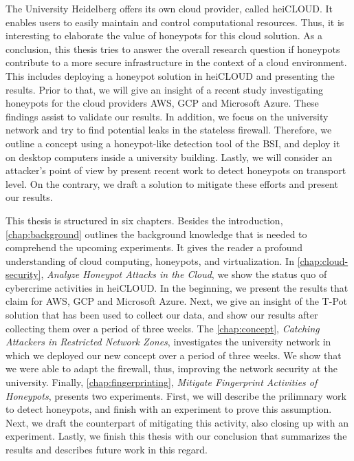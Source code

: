 The University Heidelberg offers its own cloud provider, called heiCLOUD.
It enables users to easily maintain and control computational resources. 
Thus, it is interesting to elaborate the value of honeypots for this cloud solution.
As a conclusion, this thesis tries to answer the overall research question if honeypots contribute to a more secure infrastructure in the context of a cloud environment.
This includes deploying a honeypot solution in heiCLOUD and presenting the results.
Prior to that, we will give an insight of a recent study investigating honeypots for the cloud providers AWS, GCP and Microsoft Azure.
These findings assist to validate our results.
In addition, we focus on the university network and try to find potential leaks in the stateless firewall.
Therefore, we outline a concept using a honeypot-like detection tool of the BSI, and deploy it on desktop computers inside a university building.
Lastly, we will consider an attacker's point of view by present recent work to detect honeypots on transport level.
On the contrary, we draft a solution to mitigate these efforts and present our results.

This thesis is structured in six chapters.
Besides the introduction, \autoref{chap:background} outlines the background knowledge that is needed to comprehend the upcoming experiments.
It gives the reader a profound understanding of cloud computing, honeypots, and virtualization.
In \autoref{chap:cloud-security}, \textit{Analyze Honeypot Attacks in the Cloud}, we show the status quo of cybercrime activities in heiCLOUD.
In the beginning, we present the results that \citet{Kelly2021} claim for AWS, GCP and Microsoft Azure.
Next, we give an insight of the T-Pot solution that has been used to collect our data, and show our results after collecting them over a period of three weeks.
The \autoref{chap:concept}, \textit{Catching Attackers in Restricted Network Zones}, investigates the university network in which we deployed our new concept over a period of three weeks.
We show that we were able to adapt the firewall, thus, improving the network security at the university.
Finally, \autoref{chap:fingerprinting}, \textit{Mitigate Fingerprint Activities of Honeypots}, presents two experiments.
First, we will describe the prilimnary work to detect honeypots, and finish with an experiment to prove this assumption.
Next, we draft the counterpart of mitigating this activity, also closing up with an experiment.
Lastly, we finish this thesis with our conclusion that summarizes the results and describes future work in this regard.
